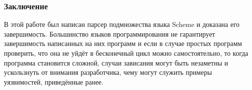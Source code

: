 \documentclass[10pt,a4paper]{beamer}
\begin{document}
\begin{frame}
\frametitle{Заключение}

В этой работе был написан парсер подмножества языка Scheme и доказана его завершимость. Большинство языков программирования не гарантирует завершимость написанных на них программ и если в случае простых программ проверить, что она не уйдёт в бесконечный цикл можно самостоятельно, то когда программа становится сложной, случаи зависания могут быть незаметны и ускользнуть от внимания разработчика, чему могут служить примеры уязвимостей, приведённые ранее.

\end{frame}


\end{document}
